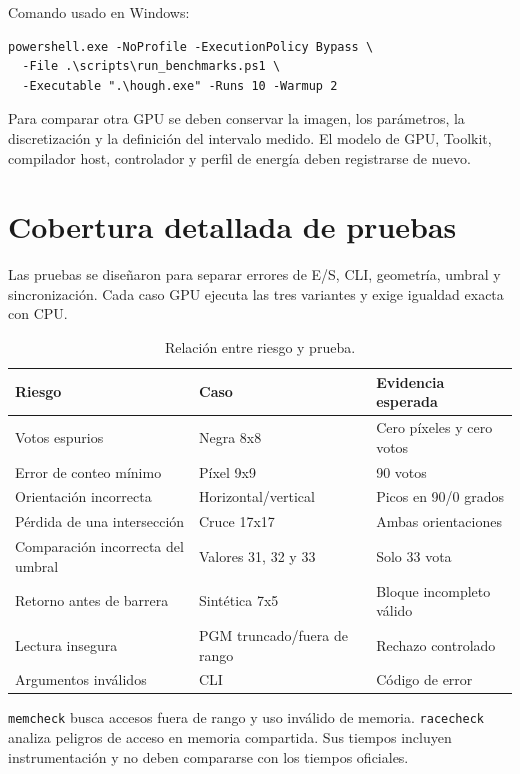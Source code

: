 \documentclass[12pt,letterpaper]{article}
\begin{document}
Comando usado en Windows:

\begin{lstlisting}[language={}]
powershell.exe -NoProfile -ExecutionPolicy Bypass \
  -File .\scripts\run_benchmarks.ps1 \
  -Executable ".\hough.exe" -Runs 10 -Warmup 2
\end{lstlisting}

Para comparar otra GPU se deben conservar la imagen, los parámetros, la discretización y la definición del intervalo medido. El modelo de GPU, Toolkit, compilador host, controlador y perfil de energía deben registrarse de nuevo.

\section{Cobertura detallada de pruebas}

Las pruebas se diseñaron para separar errores de E/S, CLI, geometría, umbral y sincronización. Cada caso GPU ejecuta las tres variantes y exige igualdad exacta con CPU.

\begin{table}[H]
  \centering
  \caption{Relación entre riesgo y prueba.}
  \small
  \begin{tabularx}{\textwidth}{X X X}
    \toprule
    Riesgo & Caso & Evidencia esperada \\
    \midrule
    Votos espurios & Negra 8x8 & Cero píxeles y cero votos \\
    Error de conteo mínimo & Píxel 9x9 & 90 votos \\
    Orientación incorrecta & Horizontal/vertical & Picos en 90/0 grados \\
    Pérdida de una intersección & Cruce 17x17 & Ambas orientaciones \\
    Comparación incorrecta del umbral & Valores 31, 32 y 33 & Solo 33 vota \\
    Retorno antes de barrera & Sintética 7x5 & Bloque incompleto válido \\
    Lectura insegura & PGM truncado/fuera de rango & Rechazo controlado \\
    Argumentos inválidos & CLI & Código de error \\
    \bottomrule
  \end{tabularx}
\end{table}

\texttt{memcheck} busca accesos fuera de rango y uso inválido de memoria. \texttt{racecheck} analiza peligros de acceso en memoria compartida. Sus tiempos incluyen instrumentación y no deben compararse con los tiempos oficiales.
\end{document}
